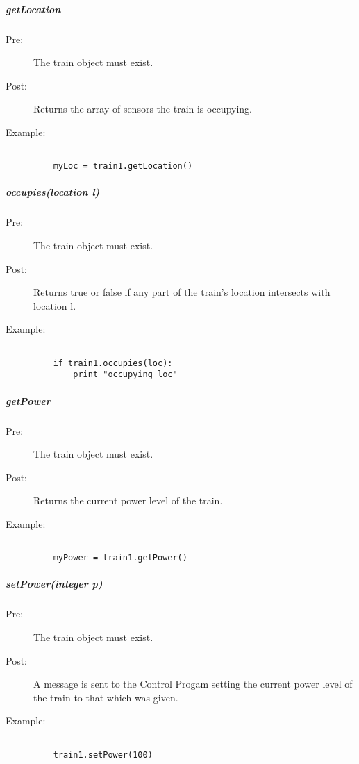 \documentclass[a4paper,11pt,notitlepage]{article}
\def\CS{Control Progam\xspace}
\begin{document}
\subparagraph{getLocation}
\begin{description}
\item[\hspace{1cm}Pre:] The train object must exist.
\item[\hspace{1cm}Post:] Returns the array of sensors the train is occupying.
\item[\hspace{1cm}Example:]
\begin{verbatim}

    myLoc = train1.getLocation()
\end{verbatim}
\end{description}


\subparagraph{occupies(location l)}
\begin{description}
\item[\hspace{1cm}Pre:] The train object must exist.
\item[\hspace{1cm}Post:] Returns true or false if any part of the train's location intersects with location l.
\item[\hspace{1cm}Example:]
\begin{verbatim}

    if train1.occupies(loc):
        print "occupying loc"
\end{verbatim}
\end{description}

\subparagraph{getPower}
\begin{description}
\item[\hspace{1cm}Pre:] The train object must exist.
\item[\hspace{1cm}Post:] Returns the current power level of the train.
\item[\hspace{1cm}Example:]
\begin{verbatim}

    myPower = train1.getPower()
\end{verbatim}
\end{description}


\subparagraph{setPower(integer p)}
\begin{description}
\item[\hspace{1cm}Pre:] The train object must exist.
\item[\hspace{1cm}Post:] A message is sent to the \CS setting the current power level of the train to that which was given.
\item[\hspace{1cm}Example:]
\begin{verbatim}

    train1.setPower(100)
\end{verbatim}
\end{description}
\end{document}
